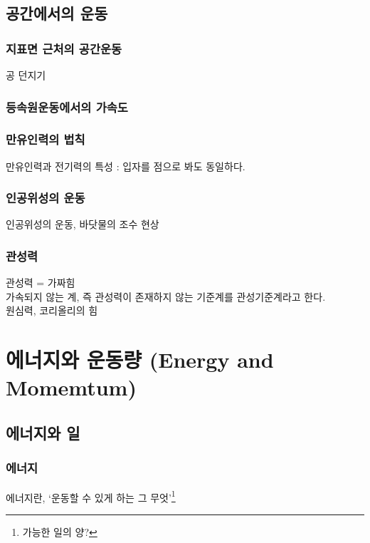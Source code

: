\documentclass[10pt,a4paper]{report}
\begin{document}
	\chapter{공간에서의 운동}
	
	\section{지표면 근처의 공간운동}
	
	공 던지기
	
	\section{등속원운동에서의 가속도}
	
	\section{만유인력의 법칙}
	
	만유인력과 전기력의 특성 : 입자를 점으로 봐도 동일하다.
	
	\section{인공위성의 운동}
	
	인공위성의 운동, 바닷물의 조수 현상
	
	\section{관성력}
	
	관성력 = 가짜힘\\
	가속되지 않는 계, 즉 관성력이 존재하지 않는 기준계를 관성기준계라고 한다.\\
	원심력, 코리올리의 힘
	
	\part{에너지와 운동량 (Energy and Momemtum)}
	
	\chapter{에너지와 일}
	
	\section{에너지}
	
	에너지란, `운동할 수 있게 하는 그 무엇'\footnote{가능한 일의 양?}
	
\end{document}
